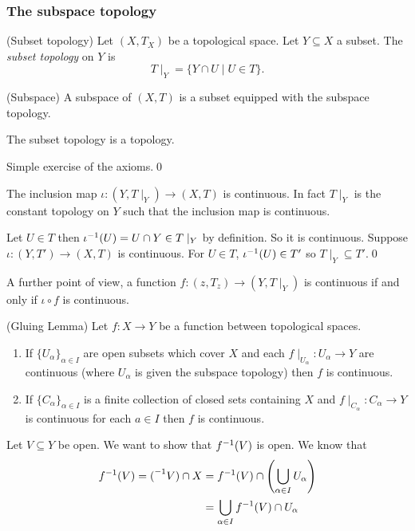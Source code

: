 \documentclass{article}
\begin{document}
\subsubsection{The subspace topology}
\begin{definition}
	(Subset topology) Let $ (X,T_X) $ be a topological space. Let $ Y\subseteq X $ a subset. The \textit{subset topology} on $ Y $ is 
	\[
		T\mid_Y = \{Y\cap U \mid U\in T\}.
	\]
\end{definition}
\begin{definition}
	(Subspace) A subspace of $ (X,T) $ is a subset equipped with the subspace topology.
\end{definition}
\begin{proposition}
  The subset topology is a topology.
\end{proposition}
\pf Simple exercise of the axioms.\qed
\begin{proposition}
  The inclusion map $ \iota: (Y,T\mid_Y)\to (X,T) $ is continuous. In fact $ T\mid_Y $ is the constant topology on $ Y $ such that the inclusion map is continuous.
\end{proposition}
\pf Let $ U\in T $ then $ {\iota}^{-1} (U) = U\cap Y\in T\mid_Y $ by definition. So it is continuous. Suppose $ \iota : (Y,T')\to (X,T)$ is continuous. For $ U\in T $, $ {\iota}^{-1}(U)\in T' $ so $ T\mid_Y\subseteq T' $.\qed
\par
A further point of view, a function $ f:(z,T_z)\to (Y,T\mid_Y) $ is continuous if and only if $ \iota \circ f$ is continuous. 
\begin{lemma}
	(Gluing Lemma) Let $ f:X\to Y $ be a function between topological spaces.
	\begin{enumerate}
		\item If $ \{U_\alpha\}_{\alpha\in I} $ are open subsets which cover $ X $ and each $ f\mid_{U_\alpha}:U_\alpha\to Y $ are continuous (where $ U_\alpha $ is given the subspace topology) then $ f $ is continuous.
	\item If $ \{C_\alpha\}_{\alpha\in I} $ is a finite collection of closed sets containing $ X $ and $ f\mid_{C_\alpha}:C_\alpha\to Y $ is continuous for each $ a\in I $ then $ f $ is continuous.
	\end{enumerate}
\end{lemma}
\pf Let $ V\subseteq Y $ be open. We want to show that $ {f}^{-1}(V) $ is open. We know that
\begin{align*}
	{f}^{-1}(V) = {(}^{-1}V) \cap X &= {f}^{-1}(V)\cap\left(\bigcup_{\alpha\in I}U_\alpha\right)\\
				   &= \bigcup_{\alpha\in I}{f}^{-1}(V)\cap U_\alpha
\end{align*}
\end{document}
